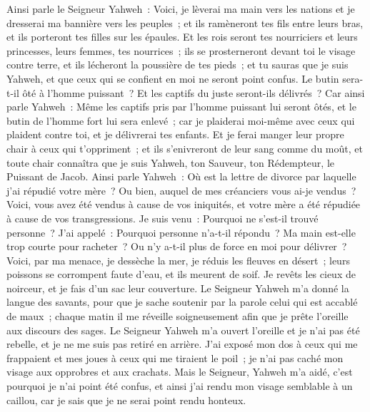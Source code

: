 \begin{multicols}{2}
Ainsi parle le Seigneur Yahweh~: Voici, je lèverai ma main vers les nations et je dresserai ma bannière vers les peuples~; et ils ramèneront tes fils entre leurs bras, et ils porteront tes filles sur les épaules.
Et les rois seront tes nourriciers et leurs princesses, leurs femmes, tes nourrices~; ils se prosterneront devant toi le visage contre terre, et ils lécheront la poussière de tes pieds~; et tu sauras que je suis Yahweh, et que ceux qui se confient en moi ne seront point confus.
Le butin sera-t-il ôté à l'homme puissant~? Et les captifs du juste seront-ils délivrés~?
Car ainsi parle Yahweh~: Même les captifs pris par l'homme puissant lui seront ôtés, et le butin de l'homme fort lui sera enlevé~; car je plaiderai moi-même avec ceux qui plaident contre toi, et je délivrerai tes enfants.
Et je ferai manger leur propre chair à ceux qui t'oppriment~; et ils s'enivreront de leur sang comme du moût, et toute chair connaîtra que je suis Yahweh, ton Sauveur, ton Rédempteur, le Puissant de Jacob.
\VerseOne{}Ainsi parle Yahweh~: Où est la lettre de divorce par laquelle j'ai répudié votre mère~? Ou bien, auquel de mes créanciers vous ai-je vendus~? Voici, vous avez été vendus à cause de vos iniquités, et votre mère a été répudiée à cause de vos transgressions.
Je suis venu~: Pourquoi ne s'est-il trouvé personne~? J'ai appelé~: Pourquoi personne n'a-t-il répondu~? Ma main est-elle trop courte pour racheter~? Ou n'y a-t-il plus de force en moi pour délivrer~? Voici, par ma menace, je dessèche la mer, je réduis les fleuves en désert~; leurs poissons se corrompent faute d'eau, et ils meurent de soif.
Je revêts les cieux de noirceur, et je fais d'un sac leur couverture.
Le Seigneur Yahweh m'a donné la langue des savants, pour que je sache soutenir par la parole celui qui est accablé de maux~; chaque matin il me réveille soigneusement afin que je prête l'oreille aux discours des sages.
Le Seigneur Yahweh m'a ouvert l'oreille et je n'ai pas été rebelle, et je ne me suis pas retiré en arrière.
J'ai exposé mon dos à ceux qui me frappaient et mes joues à ceux qui me tiraient le poil~; je n'ai pas caché mon visage aux opprobres et aux crachats.
Mais le Seigneur, Yahweh m'a aidé, c'est pourquoi je n'ai point été confus, et ainsi j'ai rendu mon visage semblable à un caillou, car je sais que je ne serai point rendu honteux.

\end{multicols}
